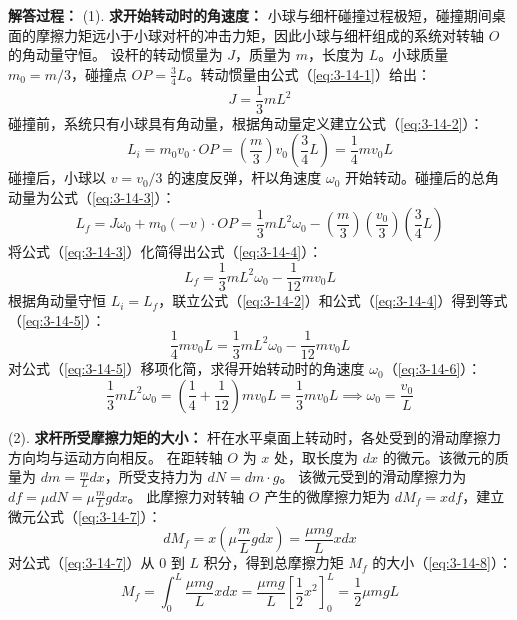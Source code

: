 \textbf{解答过程：}
(1). \textbf{求开始转动时的角速度：}
小球与细杆碰撞过程极短，碰撞期间桌面的摩擦力矩远小于小球对杆的冲击力矩，因此小球与细杆组成的系统对转轴 $O$ 的角动量守恒。
设杆的转动惯量为 $J$，质量为 $m$，长度为 $L$。小球质量 $m_0 = m/3$，碰撞点 $OP = \frac{3}{4}L$。转动惯量由公式（\ref{eq:3-14-1}）给出：
\begin{equation}\label{eq:3-14-1}
	J = \frac{1}{3}mL^2
\end{equation}
碰撞前，系统只有小球具有角动量，根据角动量定义建立公式（\ref{eq:3-14-2}）：
\begin{equation}\label{eq:3-14-2}
	L_i = m_0 v_0 \cdot OP = \left(\frac{m}{3}\right) v_0 \left(\frac{3}{4}L\right) = \frac{1}{4} m v_0 L
\end{equation}
碰撞后，小球以 $v = v_0/3$ 的速度反弹，杆以角速度 $\omega_0$ 开始转动。碰撞后的总角动量为公式（\ref{eq:3-14-3}）：
\begin{equation}\label{eq:3-14-3}
	L_f = J \omega_0 + m_0 (-v) \cdot OP = \frac{1}{3}mL^2 \omega_0 - \left(\frac{m}{3}\right) \left(\frac{v_0}{3}\right) \left(\frac{3}{4}L\right)
\end{equation}
将公式（\ref{eq:3-14-3}）化简得出公式（\ref{eq:3-14-4}）：
\begin{equation}\label{eq:3-14-4}
	L_f = \frac{1}{3}mL^2 \omega_0 - \frac{1}{12} m v_0 L
\end{equation}
根据角动量守恒 $L_i = L_f$，联立公式（\ref{eq:3-14-2}）和公式（\ref{eq:3-14-4}）得到等式（\ref{eq:3-14-5}）：
\begin{equation}\label{eq:3-14-5}
	\frac{1}{4} m v_0 L = \frac{1}{3}mL^2 \omega_0 - \frac{1}{12} m v_0 L
\end{equation}
对公式（\ref{eq:3-14-5}）移项化简，求得开始转动时的角速度 $\omega_0$（\ref{eq:3-14-6}）：
\begin{equation}\label{eq:3-14-6}
	\frac{1}{3}mL^2 \omega_0 = \left(\frac{1}{4} + \frac{1}{12}\right) m v_0 L = \frac{1}{3} m v_0 L \implies \omega_0 = \frac{v_0}{L}
\end{equation}

(2). \textbf{求杆所受摩擦力矩的大小：}
杆在水平桌面上转动时，各处受到的滑动摩擦力方向均与运动方向相反。
在距转轴 $O$ 为 $x$ 处，取长度为 $dx$ 的微元。该微元的质量为 $dm = \frac{m}{L} dx$，所受支持力为 $dN = dm \cdot g$。
该微元受到的滑动摩擦力为 $df = \mu dN = \mu \frac{m}{L} g dx$。
此摩擦力对转轴 $O$ 产生的微摩擦力矩为 $dM_f = x df$，建立微元公式（\ref{eq:3-14-7}）：
\begin{equation}\label{eq:3-14-7}
	dM_f = x \left(\mu \frac{m}{L} g dx\right) = \frac{\mu m g}{L} x dx
\end{equation}
对公式（\ref{eq:3-14-7}）从 $0$ 到 $L$ 积分，得到总摩擦力矩 $M_f$ 的大小（\ref{eq:3-14-8}）：
\begin{equation}\label{eq:3-14-8}
	M_f = \int_{0}^{L} \frac{\mu m g}{L} x dx = \frac{\mu m g}{L} \left[ \frac{1}{2}x^2 \right]_{0}^{L} = \frac{1}{2} \mu m g L
\end{equation}

